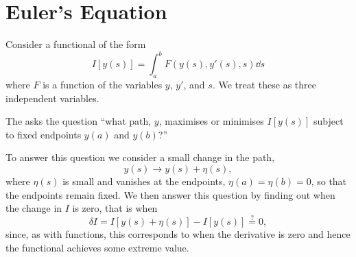 \documentclass[fleqn]{NotesClass}
\begin{document}
    \section{Euler's Equation}\label{sec:Euler's equation}
    Consider a functional of the form
    \begin{equation}
        I[y(s)] = \int_a^b F(y(s), y'(s), s) \dd{s}
    \end{equation}
    where \(F\) is a function of the variables \(y\), \(y'\), and \(s\).
    We treat these as three independent variables.
    
    The  asks the question \enquote{what path, \(y\), maximises or minimises \(I[y(s)]\) subject to fixed endpoints \(y(a)\) and \(y(b)\)?}
    
    To answer this question we consider a small change in the path,
    \begin{equation}
        y(s) \to y(s) + \eta (s),
    \end{equation}
    where \(\eta(s)\) is small and vanishes at the endpoints, \(\eta(a) = \eta(b) = 0\), so that the endpoints remain fixed.
    We then answer this question by finding out when the change in \(I\) is zero, that is when
    \begin{equation}
        \delta I = I[y(s) + \eta(s)] - I[y(s)] \stackrel{?}{=} 0,
    \end{equation}
    since, as with functions, this corresponds to when the derivative is zero and hence the functional achieves some extreme value.
    
\end{document}
